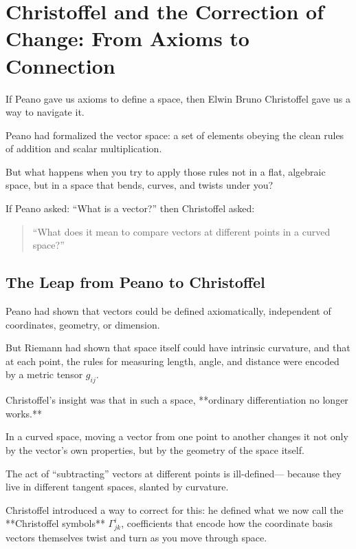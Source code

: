 \section{Christoffel and the Correction of Change: From Axioms to Connection}

If Peano gave us axioms to define a space,  
then Elwin Bruno Christoffel gave us a way to navigate it.

Peano had formalized the vector space:  
a set of elements obeying the clean rules of addition and scalar multiplication.

But what happens when you try to apply those rules not in a flat, algebraic space,  
but in a space that bends, curves, and twists under you?

If Peano asked: “What is a vector?”  
then Christoffel asked:

\begin{quote}
“What does it mean to compare vectors at different points in a curved space?”
\end{quote}

\bigskip

\subsection*{The Leap from Peano to Christoffel}

Peano had shown that vectors could be defined axiomatically,  
independent of coordinates, geometry, or dimension.

But Riemann had shown that space itself could have intrinsic curvature,  
and that at each point, the rules for measuring length, angle, and distance were encoded by a metric tensor \( g_{ij} \).

Christoffel’s insight was that in such a space, **ordinary differentiation no longer works.**

In a curved space, moving a vector from one point to another changes it not only by the vector’s own properties,  
but by the geometry of the space itself.

The act of “subtracting” vectors at different points is ill-defined—  
because they live in different tangent spaces, slanted by curvature.

\bigskip

Christoffel introduced a way to correct for this:  
he defined what we now call the **Christoffel symbols** \( \Gamma^i_{jk} \),  
coefficients that encode how the coordinate basis vectors themselves twist and turn as you move through space.

